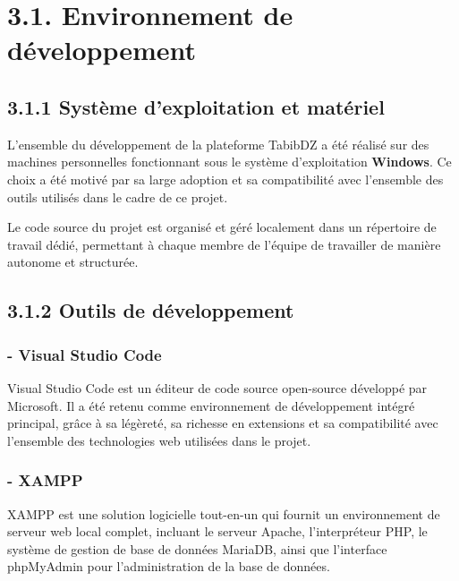 \documentclass[12pt,a4paper]{report}
\begin{document}
\newpage
\setcounter{page}{1}

\section*{3.1. Environnement de d\'eveloppement}

\subsection*{3.1.1 Syst\`eme d'exploitation et mat\'eriel}

L'ensemble du d\'eveloppement de la plateforme TabibDZ a \'et\'e r\'ealis\'e sur des machines personnelles fonctionnant sous le syst\`eme d'exploitation \textbf{Windows}. Ce choix a \'et\'e motiv\'e par sa large adoption et sa compatibilit\'e avec l'ensemble des outils utilis\'es dans le cadre de ce projet.

Le code source du projet est organis\'e et g\'er\'e localement dans un r\'epertoire de travail d\'edi\'e, permettant \`a chaque membre de l'\'equipe de travailler de mani\`ere autonome et structur\'ee.

\subsection*{3.1.2 Outils de d\'eveloppement}

\subsubsection*{- Visual Studio Code}

Visual Studio Code est un \'editeur de code source open-source d\'evelopp\'e par Microsoft. Il a \'et\'e retenu comme environnement de d\'eveloppement int\'egr\'e principal, gr\^ace \`a sa l\'eg\`eret\'e, sa richesse en extensions et sa compatibilit\'e avec l'ensemble des technologies web utilis\'ees dans le projet.

\subsubsection*{- XAMPP}

XAMPP est une solution logicielle tout-en-un qui fournit un environnement de serveur web local complet, incluant le serveur Apache, l'interpr\'eteur PHP, le syst\`eme de gestion de base de donn\'ees MariaDB, ainsi que l'interface phpMyAdmin pour l'administration de la base de donn\'ees.
\end{document}
